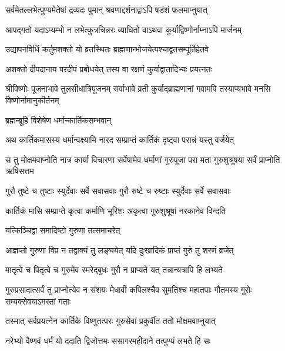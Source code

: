 \twolineshloka
{सर्वमेतल्लभेत्पुण्यमेतेषां द्रव्यदः पुमान्}
{श्रवणाद्दर्शनाद्वाऽपि षडंशं फलमाप्नुयात्} %

\twolineshloka
{आपद्गतो यदाऽप्यम्भो न लभेत्कुत्रचिन्नरः}
{व्याधितो वाऽथवा कुर्याद्विष्णोर्नाम्नाऽपि मार्जनम्} %

\twolineshloka
{उद्यापनविधिं कर्तुमशक्तो यो व्रतस्थितः}
{ब्राह्मणान्भोजयेत्पश्चाद्व्रतसम्पूर्तिहेतवे} %

\twolineshloka
{अशक्तो दीपदानाय परदीपं प्रबोधयेत्}
{तस्य वा रक्षणं कुर्याद्वातादिभ्यः प्रयत्नतः} %

\threelineshloka
{श्रीविष्णोः पूजनाभावे तुलसीधात्रिपूजनम्}
{सर्वाभावे व्रती कुर्याद्ब्राह्मणानां गवामपि}
{तस्याप्यभावे मनसि विष्णोर्नामानुकीर्तनम्} %



\onelineshloka
{ब्रह्मन्ब्रूहि विशेषेण धर्मान्कार्तिकसम्भवान्} %





\twolineshloka
{अथ कार्तिकमासस्य धर्मान्वक्ष्यामि नारद}
{सम्प्राप्तं कार्तिकं दृष्ट्वा परान्नं यस्तु वर्जयेत्} %

\threelineshloka
{स तु मोक्षमवाप्नोति नात्र कार्या विचारणा}
{सर्वेषामेव धर्माणां गुरुपूजा परा मता}
{गुरुशुश्रूषया सर्वं प्राप्नोति ऋषिसत्तम} %

\twolineshloka
{गुरौ तुष्टे च तुष्टाः स्युर्देवाः सर्वे सवासवाः}
{गुरौ रुष्टे च रुष्टाः स्युर्देवाः सर्वे सवासवाः} %


\twolineshloka
{कार्तिकं मासि सम्प्राप्ते कृत्वा कर्माणि भूरिशः}
{अकृत्वा गुरुशुश्रूषां नरकानेव विन्दति} %

\onelineshloka
{यत्किञ्चिद्वा समादिष्टो गुरुणा तत्समाचरेत्} %

\twolineshloka
{आज्ञप्तो गुरुणा विप्र न तद्वाक्यं तु लङ्घयेत्}
{यदि दुःखादिकं प्राप्तं गुरुं तु शरणं व्रजेत्} %

\twolineshloka
{मातृत्वे च पितृत्वे च गुरुमेव स्मरेद्बुधः}
{गुरौ न प्राप्यते यत् तन्नान्यत्रापि हि लभ्यते} %

\threelineshloka
{गुरुप्रसादात्सर्वं तु प्राप्नोत्येव न संशयः}
{मेधावी कपिलश्चैव सुमतिश्च महातपाः}
{गौतमस्य गुरोः सम्यक्सेवयाऽमरतां गताः} %

\twolineshloka
{तस्मात् सर्वप्रयत्नेन कार्तिके विष्णुतत्परः}
{गुरुसेवां प्रकुर्वीत ततो मोक्षमवाप्नुयात्} %

\twolineshloka
{नरेभ्यो वैष्णवं धर्मं यो ददाति द्विजोत्तमः}
{ससागरमहीदाने तत्पुण्यं लभते हि सः} %

